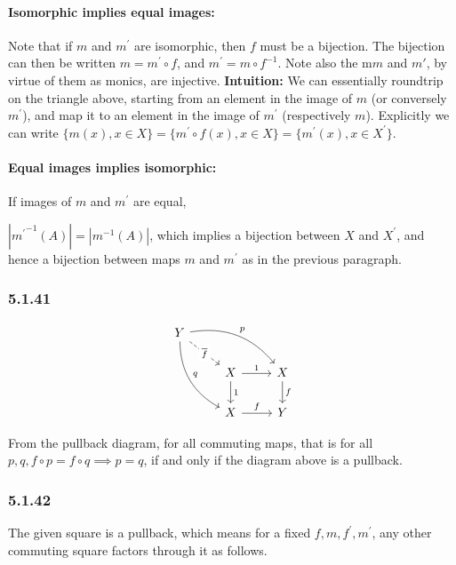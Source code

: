 \documentclass{article}
\begin{document}
\paragraph{Isomorphic implies equal images:}
Note that if $m$ and $m^\prime$ are isomorphic, then $f$ must be a bijection. The bijection can then be written $m = m^\prime \circ f$, and $m^\prime = m \circ f^{-1}$. Note also the m$m$ and $m\prime$, by virtue of them as monics, are injective. \textbf{Intuition:} We can essentially roundtrip on the triangle above, starting from an element in the image of $m$ (or conversely $m^\prime$), and map it to an element in the image of $m^\prime$ (respectively $m$).  Explicitly we can write $\{ m(x), x \in X \} = \{ m^\prime \circ f (x), x \in X \} = \{ m^\prime (x), x \in X^\prime \}$.

\paragraph{Equal images implies isomorphic:}

If images of $m$ and $m^\prime$ are equal,

$|{m^{\prime}}^{-1}(A)| = |m^{-1}(A)|$, which implies a bijection between $X$ and $X^\prime$, and hence a bijection between maps $m$ and $m^\prime$ as in the previous paragraph.

\subsubsection*{5.1.41}

\begin{equation*}
\begin{tikzcd}
Y
\arrow[drr, bend left, "p"]
\arrow[ddr, bend right, "q"]
\arrow[dr, dashed, "\overline{f}" description] & \\
& X \arrow[r, "1"] \arrow[d, "1"]
& X \arrow[d,"f"] \\
& X \arrow[r, "f"]
& Y
\end{tikzcd}
\end{equation*}

From the pullback diagram, for all commuting maps, that is for all
$p, q, f \circ p = f \circ q \implies p = q$, if and only if the diagram above is a pullback.

\subsubsection*{5.1.42}

The given square is a pullback, which means for a fixed $f,m,f^\prime,m^\prime$, any other commuting square factors through it as follows.
\end{document}

